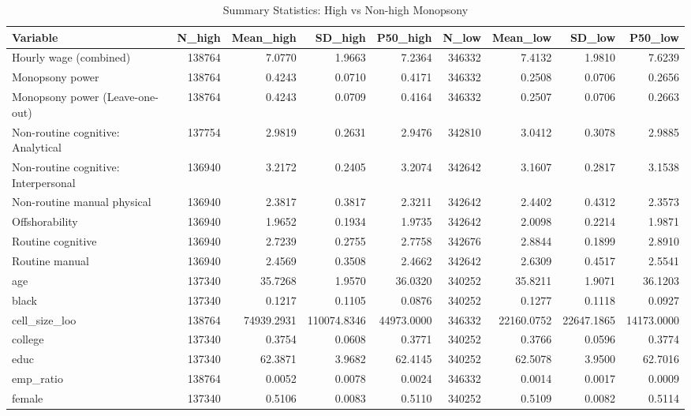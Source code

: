 \begin{table}

\caption{Summary Statistics: High vs Non-high Monopsony}
\centering
\begin{tabular}[t]{lrrrrrrrr}
\toprule
Variable & N\_high & Mean\_high & SD\_high & P50\_high & N\_low & Mean\_low & SD\_low & P50\_low\\
\midrule
Hourly wage (combined) & 138764 & 7.0770 & 1.9663 & 7.2364 & 346332 & 7.4132 & 1.9810 & 7.6239\\
Monopsony power & 138764 & 0.4243 & 0.0710 & 0.4171 & 346332 & 0.2508 & 0.0706 & 0.2656\\
Monopsony power (Leave-one-out) & 138764 & 0.4243 & 0.0709 & 0.4164 & 346332 & 0.2507 & 0.0706 & 0.2663\\
Non-routine cognitive: Analytical & 137754 & 2.9819 & 0.2631 & 2.9476 & 342810 & 3.0412 & 0.3078 & 2.9885\\
Non-routine cognitive: Interpersonal & 136940 & 3.2172 & 0.2405 & 3.2074 & 342642 & 3.1607 & 0.2817 & 3.1538\\
\addlinespace
Non-routine manual physical & 136940 & 2.3817 & 0.3817 & 2.3211 & 342642 & 2.4402 & 0.4312 & 2.3573\\
Offshorability & 136940 & 1.9652 & 0.1934 & 1.9735 & 342642 & 2.0098 & 0.2214 & 1.9871\\
Routine cognitive & 136940 & 2.7239 & 0.2755 & 2.7758 & 342676 & 2.8844 & 0.1899 & 2.8910\\
Routine manual & 136940 & 2.4569 & 0.3508 & 2.4662 & 342642 & 2.6309 & 0.4517 & 2.5541\\
age & 137340 & 35.7268 & 1.9570 & 36.0320 & 340252 & 35.8211 & 1.9071 & 36.1203\\
\addlinespace
black & 137340 & 0.1217 & 0.1105 & 0.0876 & 340252 & 0.1277 & 0.1118 & 0.0927\\
cell\_size\_loo & 138764 & 74939.2931 & 110074.8346 & 44973.0000 & 346332 & 22160.0752 & 22647.1865 & 14173.0000\\
college & 137340 & 0.3754 & 0.0608 & 0.3771 & 340252 & 0.3766 & 0.0596 & 0.3774\\
educ & 137340 & 62.3871 & 3.9682 & 62.4145 & 340252 & 62.5078 & 3.9500 & 62.7016\\
emp\_ratio & 138764 & 0.0052 & 0.0078 & 0.0024 & 346332 & 0.0014 & 0.0017 & 0.0009\\
\addlinespace
female & 137340 & 0.5106 & 0.0083 & 0.5110 & 340252 & 0.5109 & 0.0082 & 0.5114\\
\bottomrule
\end{tabular}
\end{table}
